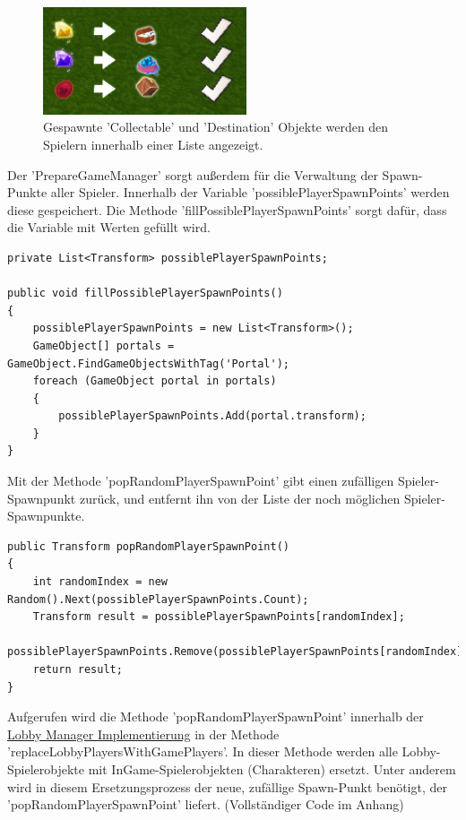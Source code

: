 \begin{figure}[H]
	\centering
	\includegraphics[width=60mm]{images/prototyp_task_list.png}
	\caption[Initial Task List]{Gespawnte 'Collectable' und 'Destination' Objekte werden den Spielern innerhalb einer Liste angezeigt.}
	\label{pic:prototyp_task_list}
\end{figure}

Der 'PrepareGameManager' sorgt außerdem für die Verwaltung der Spawn-Punkte aller Spieler. Innerhalb der Variable 'possiblePlayerSpawnPoints' werden diese gespeichert. Die Methode 'fillPossiblePlayerSpawnPoints' sorgt dafür, dass die Variable mit Werten gefüllt wird.

\begin{lstlisting}[caption= PrepareGameManager.cs fillPossiblePlayerSpawnPoints()]
private List<Transform> possiblePlayerSpawnPoints;

public void fillPossiblePlayerSpawnPoints()
{
	possiblePlayerSpawnPoints = new List<Transform>();
	GameObject[] portals = GameObject.FindGameObjectsWithTag('Portal');
	foreach (GameObject portal in portals)
	{
		possiblePlayerSpawnPoints.Add(portal.transform);
	}
}
\end{lstlisting}

Mit der Methode 'popRandomPlayerSpawnPoint' gibt einen zufälligen Spieler-Spawnpunkt zurück, und entfernt ihn von der Liste der noch möglichen Spieler-Spawnpunkte.

\begin{lstlisting}[caption= PrepareGameManager.cs popRandomPlayerSpawnPoint()]
public Transform popRandomPlayerSpawnPoint()
{
	int randomIndex = new Random().Next(possiblePlayerSpawnPoints.Count);
	Transform result = possiblePlayerSpawnPoints[randomIndex];
	possiblePlayerSpawnPoints.Remove(possiblePlayerSpawnPoints[randomIndex]);
	return result;
}
\end{lstlisting}

Aufgerufen wird die Methode 'popRandomPlayerSpawnPoint' innerhalb der \hyperref[Lobby Manager Implementierung]{Lobby Manager Implementierung} in der Methode 'replaceLobbyPlayersWithGamePlayers'. In dieser Methode werden alle Lobby-Spielerobjekte mit InGame-Spielerobjekten (Charakteren) ersetzt. Unter anderem wird in diesem Ersetzungsprozess der neue, zufällige Spawn-Punkt benötigt, der 'popRandomPlayerSpawnPoint' liefert. (Vollständiger Code im Anhang)

